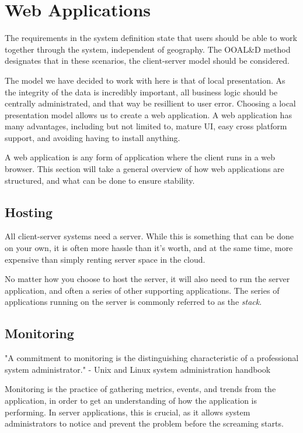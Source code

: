 \section{Web Applications}
The requirements in the system definition state that users should be able to work together through the system, independent of geography. The OOAL\&D method designates that in these scenarios, the client-server model should be considered. %

The model we have decided to work with here is that of local presentation. As the integrity of the data is incredibly important, all business logic should be centrally administrated, and that way be resillient to user error.
Choosing a local presentation model allows us to create a web application. A web application has many advantages, including but not limited to, mature UI, easy cross platform support, and avoiding having to install anything.

A web application is any form of application where the client runs in a web browser. This section will take a general overview of how web applications are structured, and what can be done to ensure stability.

\subsection{Hosting}
All client-server systems need a server. While this is something that can be done on your own, it is often more hassle than it's worth, and at the same time, more expensive than simply renting server space in the cloud.

No matter how you choose to host the server, it will also need to run the server application, and often a series of other supporting applications. The series of applications running on the server is commonly referred to as the \textit{stack}.
\subsection{Monitoring}
"A commitment to monitoring is the distinguishing characteristic of a professional system administrator." - Unix and Linux system administration handbook

Monitoring is the practice of gathering metrics, events, and trends from the application, in order to get an understanding of how the application is performing.
In server applications, this is crucial, as it allows system administrators to notice and prevent the problem before the screaming starts.


